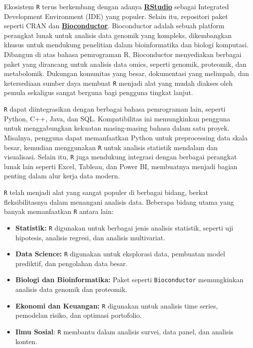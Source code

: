 \documentclass[
  oneside]{book}
\begin{document}
Ekosistem \texttt{R} terus berkembang dengan adanya
\href{https://posit.co/download/rstudio-desktop/}{\textbf{RStudio}} sebagai
Integrated Development Environment (IDE) yang populer. Selain itu,
repositori paket seperti CRAN dan
\href{https://www.bioconductor.org/}{\textbf{Bioconductor}}. Bioconductor adalah
sebuah platform perangkat lunak untuk analisis data genomik yang
kompleks, dikembangkan khusus untuk mendukung penelitian dalam
bioinformatika dan biologi komputasi. Dibangun di atas bahasa
pemrograman R, Bioconductor menyediakan berbagai paket yang dirancang
untuk analisis data omics, seperti genomik, proteomik, dan metabolomik.
Dukungan komunitas yang besar, dokumentasi yang melimpah, dan
ketersediaan sumber daya membuat \texttt{R} menjadi alat yang mudah
diakses oleh pemula sekaligus sangat berguna bagi pengguna tingkat
lanjut.

\texttt{R} dapat diintegrasikan dengan berbagai bahasa pemrograman
lain, seperti Python, C++, Java, dan SQL. Kompatibilitas ini
memungkinkan pengguna untuk menggabungkan kekuatan masing-masing bahasa
dalam satu proyek. Misalnya, pengguna dapat memanfaatkan Python untuk
preprocessing data skala besar, kemudian menggunakan \texttt{R}
untuk analisis statistik mendalam dan visualisasi. Selain itu,
\texttt{R} juga mendukung integrasi dengan berbagai perangkat lunak
lain seperti Excel, Tableau, dan Power BI, membuatnya menjadi bagian
penting dalam alur kerja data modern.

\texttt{R} telah menjadi alat yang sangat populer di berbagai
bidang, berkat fleksibilitasnya dalam menangani analisis data. Beberapa
bidang utama yang banyak memanfaatkan \texttt{R} antara lain:

\begin{itemize}
\item
  \textbf{Statistik:} \texttt{R} digunakan untuk berbagai jenis
  analisis statistik, seperti uji hipotesis, analisis regresi, dan
  analisis multivariat.
\item
  \textbf{Data Science:} \texttt{R} digunakan untuk eksplorasi data,
  pembuatan model prediktif, dan pengolahan data besar.
\item
  \textbf{Biologi dan Bioinformatika:} Paket seperti \texttt{Bioconductor}
  memungkinkan analisis data genomik dan proteomik.
\item
  \textbf{Ekonomi dan Keuangan:} \texttt{R} digunakan untuk analisis
  time series, pemodelan risiko, dan optimasi portofolio.
\item
  \textbf{Ilmu Sosial}: \texttt{R} membantu dalam analisis survei,
  data panel, dan analisis konten.
\end{itemize}
\end{document}
